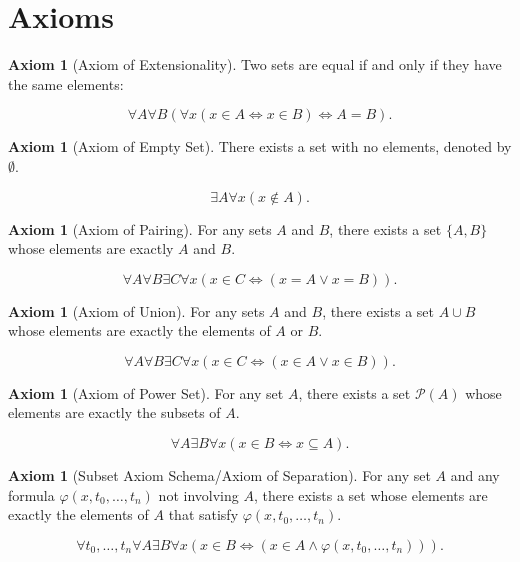 \documentclass[12pt, reqno]{amsart}
\theoremstyle{definition}
\newtheorem{axiom}[theorem]{Axiom}
\theoremstyle{remark}
\numberwithin{equation}{section}
\begin{document}
{\section{Axioms}

\begin{axiom}[Axiom of Extensionality]
    Two sets are equal if and only if they have the same elements:

    \[
        \forall A \forall B (\forall x (x\in A \iff x\in B) \iff A = B).   
    \]
\end{axiom}

\begin{axiom}[Axiom of Empty Set]
    There exists a set with no elements, denoted by $\emptyset$.

    \[
        \exists A \forall x (x\notin A).
    \]
\end{axiom}

\begin{axiom}[Axiom of Pairing]
    For any sets $A$ and $B$, there exists a set $\{A, B\}$ whose elements are exactly $A$ and $B$.

    \[
        \forall A \forall B \exists C \forall x (x\in C \iff (x = A \lor x = B)).
    \]
\end{axiom}

\begin{axiom}[Axiom of Union]
    For any sets $A$ and $B$, there exists a set $A\cup B$ whose elements are exactly the elements of $A$ or $B$.

    \[
        \forall A \forall B \exists C \forall x (x\in C \iff (x\in A \lor x\in B)).
    \]
\end{axiom}

\begin{axiom}[Axiom of Power Set]
    For any set $A$, there exists a set $\mathcal{P}(A)$ whose elements are exactly the subsets of $A$.

    \[
        \forall A \exists B \forall x (x\in B \iff x\subseteq A).
    \]
\end{axiom}

\begin{axiom}[Subset Axiom Schema/Axiom of Separation]
    For any set $A$ and any formula $\varphi(x,t_0,\ldots,t_n)$ not involving $A$, there exists a set whose elements are exactly the elements of $A$ that satisfy $\varphi(x,t_0,\ldots,t_n)$.

    \[
        \forall t_0, \ldots, t_n \forall A \exists B \forall x (x\in B \iff (x\in A \land \varphi(x,t_0,\ldots,t_n))).
    \]
\end{axiom}

}
\end{document}
